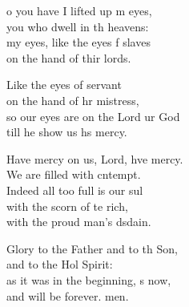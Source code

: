 \settowidth{\versewidth}{so our eyes are on the Lord our God *}
\begin{psalmverse}%
  \begin{patverse}
o you have I lifted up m eyes,\Med\\
you who dwell in th heavens:\\
my eyes, like the eyes f slaves\Med\\
on the hand of thir lords.

Like the eyes of  servant\Med\\
on the hand of hr mistress,\\
so our eyes are on the Lord ur God\Med\\
till he show us h\pointup{\i}s mercy.

Have mercy on us, Lord, hve mercy.\Med\\
We are filled with cntempt.\\
Indeed all too full is our sul\Flex\\
with the scorn of te rich,\Med\\
with the proud man’s d\pointup{\i}sdain.

Glory to the Father and to th Son,\Med\\
and to the Hol Spirit:\\
as it was in the beginning, \pointup{\i}s now,\Med\\
and will be forever. men. 
  \end{patverse}
\end{psalmverse}
